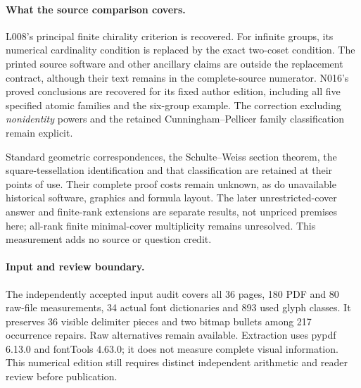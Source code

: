 \documentclass[11pt,a4paper]{article}
\begin{document}
\paragraph{What the source comparison covers.}
L008's principal finite chirality criterion is recovered. For infinite groups,
its numerical cardinality condition is replaced by the exact two-coset
condition. The printed source software and other ancillary claims are
outside the replacement contract, although their text remains in the
complete-source numerator. N016's proved conclusions are recovered for
its fixed author edition, including all five specified atomic families and
the six-group example. The correction excluding \emph{nonidentity} powers
and the retained Cunningham--Pellicer family classification remain explicit.

Standard geometric correspondences, the Schulte--Weiss section theorem,
the square-tessellation identification and that classification are retained
at their points of use. Their complete proof costs remain unknown, as do
unavailable historical software, graphics and formula layout. The later
unrestricted-cover answer and finite-rank extensions are separate results,
not unpriced premises here; all-rank finite minimal-cover multiplicity
remains unresolved. This measurement adds no source or question credit.

\paragraph{Input and review boundary.}
The independently accepted input audit covers all 36 pages, 180 PDF and
80 raw-file measurements, 34 actual font dictionaries and 893 used glyph
classes. It preserves 36 visible delimiter pieces and two bitmap bullets
among 217 occurrence repairs. Raw alternatives remain available. Extraction
uses pypdf 6.13.0 and fontTools 4.63.0; it does not measure complete visual
information. This numerical edition still requires distinct independent
arithmetic and reader review before publication.
\end{document}
